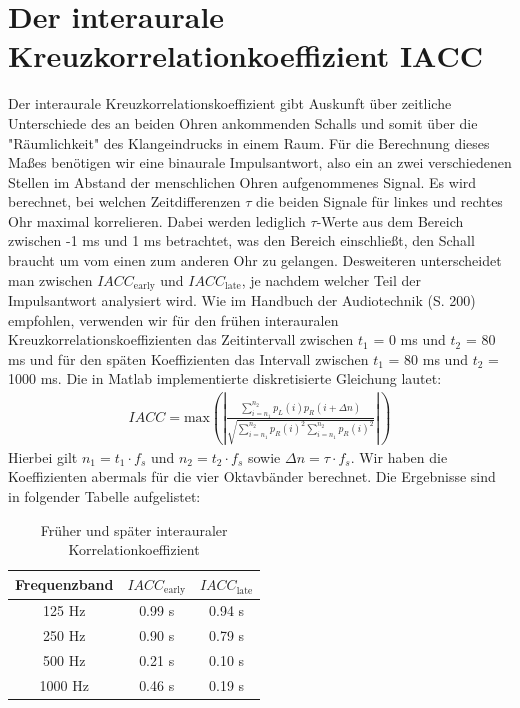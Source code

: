 \section{Der interaurale Kreuzkorrelationkoeffizient $\mathbf{IACC}$}
\label{sec:iacc}

Der interaurale Kreuzkorrelationskoeffizient gibt Auskunft über zeitliche Unterschiede des an beiden Ohren ankommenden Schalls und somit über die "Räumlichkeit" des Klangeindrucks in einem Raum. 
Für die Berechnung dieses Maßes benötigen wir eine binaurale Impulsantwort, also ein an zwei verschiedenen Stellen im Abstand der menschlichen Ohren aufgenommenes Signal. 
Es wird berechnet, bei welchen Zeitdifferenzen $\tau$ die beiden Signale für linkes und rechtes Ohr maximal korrelieren.
Dabei werden lediglich $\tau$-Werte aus dem Bereich zwischen -1 ms und 1 ms betrachtet, was den Bereich einschließt, den Schall braucht um vom einen zum anderen Ohr zu gelangen.  
Desweiteren unterscheidet man zwischen $IACC_{\mathrm{early}}$ und $IACC_{\mathrm{late}}$, je nachdem welcher Teil der Impulsantwort analysiert wird. Wie im Handbuch der Audiotechnik \cite{Weinzierl08} (S. 200) empfohlen, verwenden wir für den frühen interauralen Kreuzkorrelationskoeffizienten das Zeitintervall zwischen $t_1$ = 0 ms und $t_2$ = 80 ms und für den späten Koeffizienten das Intervall zwischen $t_1$ = 80 ms und $t_2$ = 1000 ms. 
Die in Matlab implementierte diskretisierte Gleichung lautet:
\begin{align*}
IACC = \mathrm{max}\left( \left| \frac{\sum_{i=n_1}^{n_2} p_L(i)p_R(i+\Delta n)} {\sqrt{\sum_{i=n_1}^{n_2}p_R(i)^2 \sum_{i=n_1}^{n_2} p_R(i)^2 }}\right |\right) 
\end{align*}
Hierbei gilt $n_1 = t_1 \cdot f_s$ und  $n_2 = t_2 \cdot f_s$ sowie $\Delta n = \tau \cdot f_s$.
Wir haben die Koeffizienten abermals für die vier Oktavbänder berechnet.
Die Ergebnisse sind in folgender Tabelle aufgelistet:
\begin{table}[H]
    \centering
    \caption{Früher und später interauraler Korrelationkoeffizient}
    \label{tab:iacc}
    \begin{tabular}[\textwidth]{|c|c|c|}
    \hline
        Frequenzband & $IACC_{\mathrm{early}}$ &$IACC_{\mathrm{late}}$ \\
        \hline
        125 Hz & 0.99 s & 0.94 s \\
        250 Hz & 0.90 s & 0.79 s \\
        500 Hz & 0.21 s & 0.10 s \\
        1000 Hz & 0.46 s & 0.19 s \\
        \hline
    \end{tabular}
\end{table}
